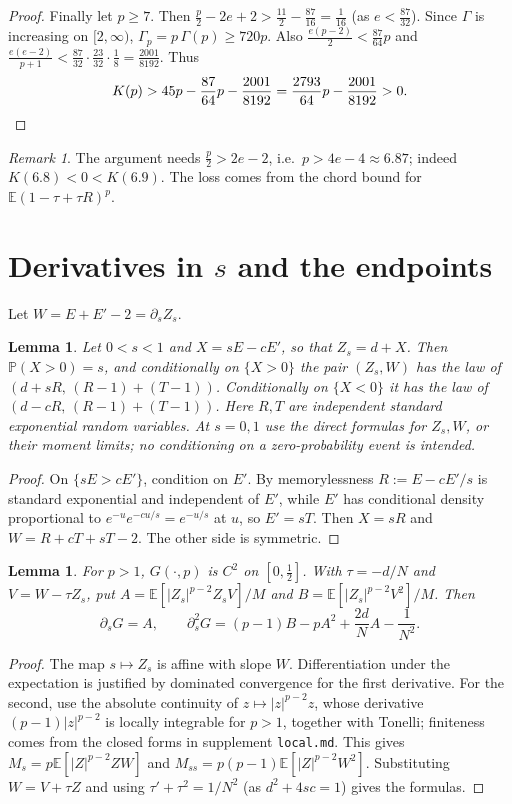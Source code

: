 \documentclass[11pt]{article}
\newtheorem{lemma}[theorem]{Lemma}
\theoremstyle{remark}
\newtheorem{remark}[theorem]{Remark}
\newcommand{\E}{\mathbb E}
\begin{document}
\begin{proof}
Finally let $p\ge7$. Then $\frac p2-2e+2>\frac{11}2-\frac{87}{16}=\frac1{16}$ (as $e<\frac{87}{32}$). Since $\Gamma$ is increasing on $[2,\infty)$, $\Gamma_p=p\,\Gamma(p)\ge720p$. Also $\frac{e(p-2)}2<\frac{87}{64}p$ and $\frac{e(e-2)}{p+1}<\frac{87}{32}\cdot\frac{23}{32}\cdot\frac18=\frac{2001}{8192}$. Thus
\[
K(p)>45p-\frac{87}{64}p-\frac{2001}{8192}=\frac{2793}{64}p-\frac{2001}{8192}>0. \qedhere
\]
\end{proof}
\begin{remark}
The argument needs $\frac p2>2e-2$, i.e.\ $p>4e-4\approx6.87$; indeed $K(6.8)<0<K(6.9)$. The loss comes from the chord bound for $\E(1-\tau+\tau R)^p$.
\end{remark}


\section{Derivatives in $s$ and the endpoints}\label{sec:local}
Let $W=E+E'-2=\partial_sZ_s$.
\begin{lemma}\label{lem:cond}
Let $0<s<1$ and $X=sE-cE'$, so that $Z_s=d+X$. Then $\mathbb P(X>0)=s$, and conditionally on $\{X>0\}$ the pair $(Z_s,W)$ has the law of $(d+sR,\,(R-1)+(T-1))$. Conditionally on $\{X<0\}$ it has the law of $(d-cR,\,(R-1)+(T-1))$. Here $R,T$ are independent standard exponential random variables. At $s=0,1$ use the direct formulas for $Z_s,W$, or their moment limits; no conditioning on a zero-probability event is intended.
\end{lemma}
\begin{proof}
On $\{sE>cE'\}$, condition on $E'$. By memorylessness $R:=E-cE'/s$ is standard exponential and independent of $E'$, while $E'$ has conditional density proportional to $e^{-u}e^{-cu/s}=e^{-u/s}$ at $u$, so $E'=sT$. Then $X=sR$ and $W=R+cT+sT-2$. The other side is symmetric.
\end{proof}

\begin{lemma}\label{lem:deriv}
For $p>1$, $G(\cdot,p)$ is $C^2$ on $[0,\frac12]$. With $\tau=-d/N$ and $V=W-\tau Z_s$, put $A=\E[|Z_s|^{p-2}Z_sV]/M$ and $B=\E[|Z_s|^{p-2}V^2]/M$. Then
\[
\partial_sG=A,\qquad \partial_s^2G=(p-1)B-pA^2+\frac{2d}{N}A-\frac1{N^2}.
\]
\end{lemma}
\begin{proof}
The map $s\mapsto Z_s$ is affine with slope $W$. Differentiation under the expectation is justified by dominated convergence for the first derivative. For the second, use the absolute continuity of $z\mapsto|z|^{p-2}z$, whose derivative $(p-1)|z|^{p-2}$ is locally integrable for $p>1$, together with Tonelli; finiteness comes from the closed forms in supplement \texttt{local.md}. This gives $M_s=p\E[|Z|^{p-2}ZW]$ and $M_{ss}=p(p-1)\E[|Z|^{p-2}W^2]$. Substituting $W=V+\tau Z$ and using $\tau'+\tau^2=1/N^2$ (as $d^2+4sc=1$) gives the formulas.
\end{proof}
\end{document}
